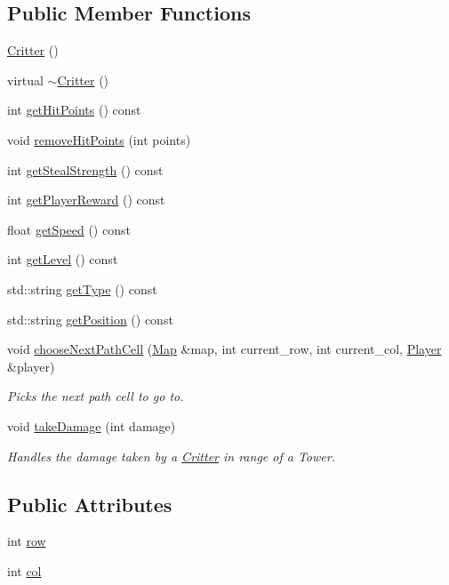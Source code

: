 \subsection*{Public Member Functions}
\begin{DoxyCompactItemize}
\item 
\hyperlink{class_critter_a05aa21e3b570d7380f3ead47c99442ef}{Critter} ()
\item 
virtual \hyperlink{class_critter_aa923c19cdc302c7bf10a038983e801c1}{$\sim$\+Critter} ()
\item 
int \hyperlink{class_critter_a1e98c05f5a41102cc37eb7a4396b90cf}{get\+Hit\+Points} () const 
\item 
void \hyperlink{class_critter_a3d18092d84c66b53adfbc480c3ce1b42}{remove\+Hit\+Points} (int points)
\item 
int \hyperlink{class_critter_a18a43eb5bca5c6bd0113eca15723c625}{get\+Steal\+Strength} () const 
\item 
int \hyperlink{class_critter_a7db2281b14479a1c931716c07acbc7da}{get\+Player\+Reward} () const 
\item 
float \hyperlink{class_critter_a3785ffa05cec86b30264fbdbf613e4f8}{get\+Speed} () const 
\item 
int \hyperlink{class_critter_aebbb372bdcd3a709428445554c3d24c9}{get\+Level} () const 
\item 
std\+::string \hyperlink{class_critter_a47b5b7e7544429f5913605bedbfb9a63}{get\+Type} () const 
\item 
std\+::string \hyperlink{class_critter_a51bd0c313d265926c561517783f4b598}{get\+Position} () const 
\item 
void \hyperlink{class_critter_acda941387ac28fc3e7e4ce92a864997e}{choose\+Next\+Path\+Cell} (\hyperlink{class_map}{Map} \&map, int current\+\_\+row, int current\+\_\+col, \hyperlink{class_player}{Player} \&player)
\begin{DoxyCompactList}\small\item\em Picks the next path cell to go to. \end{DoxyCompactList}\item 
void \hyperlink{class_critter_a963ccea758c0b04129a372572704c1fc}{take\+Damage} (int damage)
\begin{DoxyCompactList}\small\item\em Handles the damage taken by a \hyperlink{class_critter}{Critter} in range of a Tower. \end{DoxyCompactList}\end{DoxyCompactItemize}
\subsection*{Public Attributes}
\begin{DoxyCompactItemize}
\item 
int \hyperlink{class_critter_aec02dae27ba8081064ac2b035eaf82cf}{row}
\item 
int \hyperlink{class_critter_a22fc3dd912a58aafc3aa7f118f1f2440}{col}
\end{DoxyCompactItemize}
